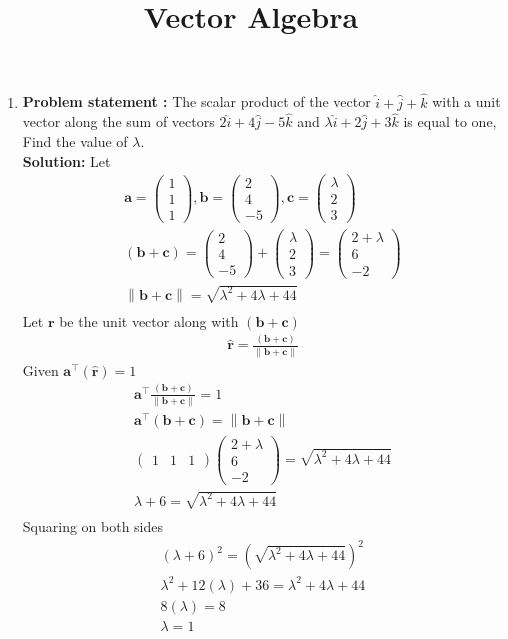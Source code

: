 \documentclass[10pt]{article}
\providecommand{\brak}[1]{\ensuremath{\left(#1\right)}}
\newcommand{\solution}{\noindent \textbf{Solution: }}
\newcommand{\myvec}[1]{\ensuremath{\begin{pmatrix}#1\end{pmatrix}}}
\providecommand{\norm}[1]{\left\lVert#1\right\rVert}
\let\vec\mathbf{}
\begin{document}
\begin{center}
\title{\textbf{Vector Algebra}}
\date{\vspace{-5ex}} %
\maketitle
\end{center}

\begin{enumerate}
\item\textbf{Problem statement :} The scalar product of the vector $\hat{i}+\hat{j}+\hat{k}$ with a unit vector along the sum of vectors $2\hat{i}+4\hat{j}-5\hat{k}$ and $\lambda\hat{i}+2\hat{j}+3\hat{k}$ is equal to one, Find the value of $\lambda$.
\\
\solution
Let
\begin{align}
\vec{a} =\myvec{1\\1\\1} , \vec{b}=\myvec{2\\4\\-5} , \vec{c}=\myvec{\lambda\\2\\3}\\
\brak{\vec{b}+\vec{c}}=\myvec{2\\4\\-5}+\myvec{\lambda\\2\\3}=\myvec{2+\lambda\\6\\-2}\\
{\norm{\vec{b}+\vec{c}}}={\sqrt{\lambda^2+4\lambda+44}}\\
\end{align}
Let $\vec{r}$ be the unit vector along with $\brak{\vec{b}+\vec{c}}$
\begin{align}
\hat{\vec{r}}=\frac{\brak{\vec{b}+\vec{c}}}{\norm{\vec{b}+\vec{c}}}
\end{align}
Given $\vec{a}^\top\brak{\vec{\hat{r}}} = 1$
\begin{align}
	\vec{a}^\top\frac{\brak{\vec{b}+\vec{c}}}{\norm{\vec{b}+\vec{c}}}=1\\
 \vec{a}^\top\brak{\vec{b}+\vec{c}}={\norm{\vec{b}+\vec{c}}}\\
\myvec{1&1&1}\myvec{2+\lambda \\ 6 \\ -2}= {\sqrt{\lambda^2+4\lambda+44}} \\
\lambda+6 = {\sqrt{\lambda^2+4\lambda+44}}\\
\end{align}
Squaring on both sides
\begin{align}
    \brak{\lambda+6}^2 = \brak{{\sqrt{\lambda^2+4\lambda+44}}}^2\\
    \lambda^2+12\brak{\lambda}+36 = \lambda^2+4\lambda+44\\
    8\brak{\lambda} = 8\\
    \lambda = 1
\end{align}
\end{enumerate}
\end{document}
